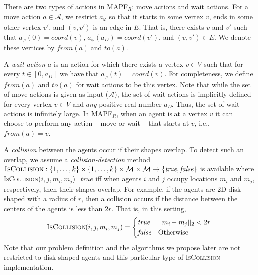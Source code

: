 \documentclass[review]{elsarticle}
\newcommand{\fromv}{\ensuremath{\mathit{from}}\xspace}
\newcommand{\tov}{\ensuremath{\mathit{to}}\xspace}
\newcommand\roni[1]{\nb{\textbf{Roni:}}{green}{#1}}
\newcommand\dor[1]{\nb{\textbf{Dor:}}{Fuchsia}{#1}}
\newcommand{\mapfr}{\ac{MAPF}$_R$\xspace}
\newcommand{\true}{\textit{true}\xspace}
\newcommand{\false}{\textit{false}\xspace}
\newcommand{\coord}{\textit{coord}\xspace}
\newcommand{\iscollision}{\textsc{IsCollision}\xspace}
\begin{document}
There are two types of actions in \mapfr: move actions and wait actions. 
For a move action $a\in \mathcal{A}$, we restrict $a_\varphi$ so that it starts in some vertex $v$, 
ends in some other vertex $v'$, and $(v,v')$ is an edge in $E$. 
That is, there exists $v$ and $v'$ such that $a_\varphi(0)=\coord(v)$, $a_\varphi(a_D)=\coord(v')$, and $(v,v')\in E$.
We denote these vertices by $\fromv(a)$ and $\tov(a)$.  

A \emph{wait action} $a$ is an action for which there exists a vertex $v\in V$ such that for every $t\in [0,a_D]$ 
we have that $a_\varphi(t)=\coord(v)$. 
For completeness, we define $\fromv(a)$ and $\tov(a)$ for wait actions to be this vertex. 
Note that while the set of move actions is given as input ($\mathcal{A}$), 
the set of wait actions is implicitly defined for every vertex $v\in V$ and \emph{any} positive real number $a_D$. 
Thus, the set of wait actions is infinitely large.
In \mapfr, when an agent is at a vertex $v$ it can choose to perform any action -- move or wait -- that starts at $v$, i.e., $\fromv(a)=v$. 

A \emph{collision} between the agents occur if their shapes overlap. To detect such an overlap, we assume a \emph{collision-detection} method $\iscollision:\{1,\ldots,k\}\times \{1,\ldots,k\}
\times \mathcal{M}\times \mathcal{M}
\rightarrow \{\true,\false\}$ 
is available where \iscollision($i,j,m_i,m_j$)=$\true$ iff when agents $i$ and $j$ occupy locations $m_i$ and $m_j$, respectively, then their shapes overlap. For example, if the agents are 2D disk-shaped with a radius of $r$, then a collision occurs if the distance between the centers of the agents is less than $2r$. That is, in this setting, 
\begin{equation}
\iscollision(i,j, m_i,m_j)=
\begin{cases}
\true & ||m_i-m_j||_2 < 2r \\
\false & \text{Otherwise}
\end{cases}
\end{equation}
Note that our problem definition and the algorithms we propose later are not restricted to disk-shaped agents and this particular type of \iscollision implementation. 
\end{document}
